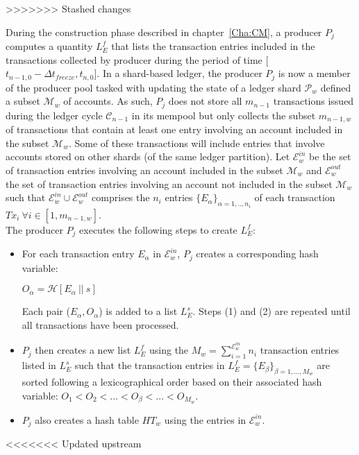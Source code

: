>>>>>>> Stashed changes

During the construction phase described in chapter~\ref{Cha:CM}, a producer $P_j$ computes a quantity $L_E^f$ that lists the transaction entries included in the transactions collected by producer during the period of time [$t_{n-1,0} - \Delta t_{freeze}, t_{n,0}$]. In a shard-based ledger, the producer $P_j$ is now a member of the producer pool tasked with updating the state of a ledger shard $\mathcal{P}_w$ defined a subset $\mathcal{M}_w$ of accounts. As such, $P_j$ does not store all $m_{n-1}$ transactions issued during the ledger cycle $\mathcal{C}_{n-1}$ in its mempool but only collects the subset $m_{n-1,w}$ of transactions that contain at least one entry involving  an account included in the subset $\mathcal{M}_w$. Some of these transactions will include entries that involve accounts stored on other shards (of the same ledger partition). Let $\mathcal{E}^{in}_w$ be the set of transaction entries involving an account included in the subset $\mathcal{M}_w$ and $\mathcal{E}^{out}_w$ the set of transaction entries involving  an account not included in the subset $\mathcal{M}_w$ such that $\mathcal{E}^{in}_w \cup \mathcal{E}^{out}_w$ comprises the $n_i$ entries $\{E_\alpha\}_{\alpha=1,..,n_i}$ of each transaction $Tx_i~\forall i \in  [1, m_{n-1,w}]$.\\

The producer $P_j$ executes the following steps to create $L_E^f$:
\begin{itemize}
\item For each transaction entry $E_\alpha$ in $\mathcal{E}^{in}_w$, $P_j$ creates a corresponding hash variable: 
\begin{center}
$O_\alpha = \mathcal{H}[E_\alpha~||~s]$
\end{center}
Each pair ($E_\alpha,O_\alpha$) is added to a list $L^s_E$. Steps (1) and (2) are repeated until all transactions have been processed.
\item	$P_j$ then creates a new list $L^f_E$ using the $M_w=\sum_{i=1}^{\mathcal{E}^{in}_w}n_i$ transaction entries listed in $L^s_E$ such that the transaction entries in $L^f_E = \{E_\beta\}_{\beta=1,...,M_w}$ are sorted following a lexicographical order based on their associated hash variable: $O_1 < O_2 < ... < O_\beta < ... < O_{M_w}$. 
\item $P_j$ also creates a hash table $HT_w$ using the entries in $\mathcal{E}^{in}_w$.
\end{itemize}

<<<<<<< Updated upstream




